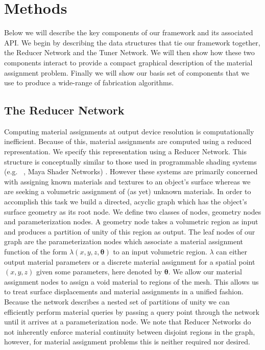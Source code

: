 \documentclass[annual]{acmsiggraph}
\begin{document}
\section{Methods}
Below we will describe the key components of our framework and its associated API. We begin by describing the data structures that tie our framework together, the Reducer Network and the Tuner Network. We will then show how these two components interact to provide a compact graphical description of the material assignment problem. Finally we will show our basis set of components that we use to produce a wide-range of fabrication algorithms. 
\subsection{The Reducer Network}
Computing material assignments at output device resolution is computationally inefficient. Because of this, material assignments are computed  using a reduced representation. We specify this representation using a Reducer Network.  This structure is conceptually similar to those used in programmable shading systems (e.g. ~\cite{Cook1984}, Maya Shader Networks) . However these systems are primarily concerned with assigning known materials and textures to an object's surface whereas we are seeking a volumetric assignment of (as yet) unknown materials. In order to accomplish this task we build a directed, acyclic graph which has the object's surface geometry as its root node. We define two classes of nodes, geometry nodes and parameterization nodes. A geometry node takes a volumetric region as input and produces a partition of unity of this region as output. The leaf nodes of our graph are the parameterization nodes which associate a material assignment function of the form $\lambda\left(x,y,z, \boldsymbol{\theta}\right)$ to an input volumetric region. 
$\lambda$ can either output material parameters or a discrete material assignment for a spatial point $\left(x,y,z\right)$ given some parameters, here denoted by $ \boldsymbol{\theta}$. We allow our material assignment nodes to assign a void material to regions of the mesh. This allows us to treat surface displacements and material assignments in a unified fashion. Because the network describes a nested set of partitions of unity we can efficiently perform material queries by passing a query point through the network until it arrives at a parameterization node. We note that Reducer Networks do not inherently enforce material continuity between disjoint regions in the graph, however, for material assignment problems this is neither required nor desired. 
\end{document}
